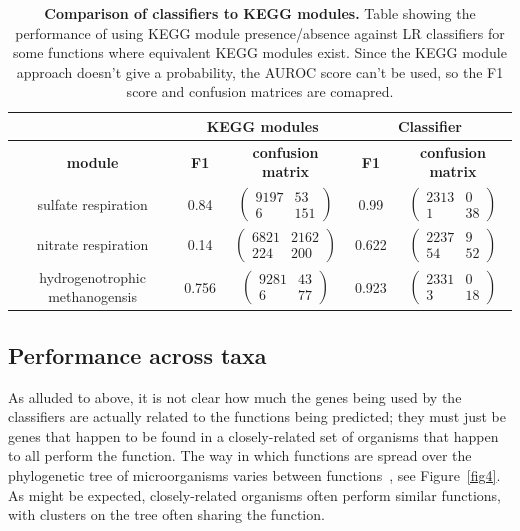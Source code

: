 \documentclass[10pt,letterpaper]{article}
\begin{document}
\begin{table}
\scriptsize
\begin{tabular}{|c|c|c|c|c|}\cline{2-5}%

 \multicolumn{1}{c|}{} &  \multicolumn{2}{|c|}{\bfseries KEGG modules} & \multicolumn{2}{|c|}{\bfseries Classifier} \\ \hline
 \rowcolor{LightGray} \bfseries module & \bfseries F1 & \bfseries confusion matrix & \bfseries F1 & \bfseries confusion matrix \\\hline
sulfate respiration & 0.84 & $\begin{pmatrix}9197 & 53 \\ 6 & 151\end{pmatrix}$ & 0.99 & $\begin{pmatrix}2313 & 0 \\ 1 & 38\end{pmatrix}$\\ \hline
nitrate respiration & 0.14 & $\begin{pmatrix}6821 & 2162\\ 224 & 200\end{pmatrix}$ & 0.622 & $\begin{pmatrix}2237 & 9 \\ 54 & 52\end{pmatrix}$\\ \hline
hydrogenotrophic methanogensis & 0.756 & $\begin{pmatrix}9281 & 43 \\ 6 & 77\end{pmatrix}$ & 0.923 & $\begin{pmatrix} 2331 & 0\\ 3 & 18\end{pmatrix}$\\ \hline
\end{tabular}

\caption{{\bf Comparison of classifiers to KEGG modules.}
Table showing the performance of using KEGG module presence/absence against LR classifiers for some functions where equivalent KEGG modules exist. Since the KEGG module approach doesn't give a probability, the AUROC score can't be used, so the F1 score and confusion matrices are comapred.}\label{tab2}
\end{table}

\subsection*{Performance across taxa}
As alluded to above, it is not clear how much the genes being used by the classifiers are actually related to the functions being predicted; they must just be genes that happen to be found in a closely-related set of organisms that happen to all perform the function. The way in which functions are spread over the phylogenetic tree of microorganisms varies between functions~\cite{Martiny2015}, see Figure~\ref{fig4}. As might be expected, closely-related organisms often perform similar functions, with clusters on the tree often sharing the function.
\end{document}
